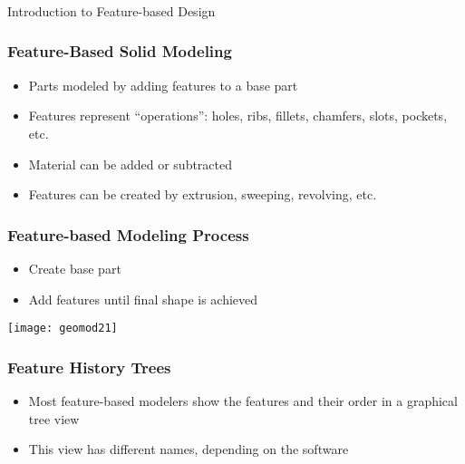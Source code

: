 \begin{frame}[fragile]\frametitle{}
\begin{center}
{\Large Introduction to Feature-based Design}
\end{center}
\end{frame}

\begin{frame}[fragile]\frametitle{Feature-Based Solid Modeling}

\begin{itemize}
\item Parts modeled by adding features to a base part
\item Features represent ``operations'': holes, ribs, fillets, chamfers, slots, pockets, etc.
\item Material can be added or subtracted
\item Features can be created by extrusion, sweeping, revolving, etc.
\end{itemize}

\end{frame}

\begin{frame}[fragile]\frametitle{Feature-based Modeling Process}

\begin{itemize}
\item Create base part
\item Add features until final shape is achieved
\end{itemize}

			\begin{center}
	\texttt{[image: geomod21]}
			\end{center}
\end{frame}

\begin{frame}[fragile]\frametitle{Feature History Trees}

\begin{itemize}
\item Most feature-based modelers show the features and their order in a graphical tree view
\item This view has different names, depending on the software
\end{itemize}
\end{frame}

